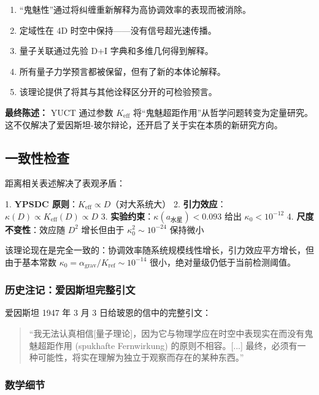 \documentclass[11pt,a4paper]{article}
\begin{document}
	\begin{enumerate}
		\item “鬼魅性”通过将纠缠重新解释为高协调效率的表现而被消除。
		
		\item 定域性在 4D 时空中保持——没有信号超光速传播。
		
		\item 量子关联通过先验 D+I 字典和多维几何得到解释。
		
		\item 所有量子力学预言都被保留，但有了新的本体论解释。
		
		\item 该理论提供了将其与其他诠释区分开的可检验预言。
	\end{enumerate}
	
	\textbf{最终陈述：} YUCT 通过参数 $K_{\mathrm{eff}}$ 将“鬼魅超距作用”从哲学问题转变为定量研究。这不仅解决了爱因斯坦-玻尔辩论，还开启了关于实在本质的新研究方向。
	
	\subsection{一致性检查}
	
	距离相关表述解决了表观矛盾：
	
	1. \textbf{YPSDC 原则}：$K_{\mathrm{eff}} \propto D$（对大系统大）
	2. \textbf{引力效应}：$\kappa(D) \propto K_{\mathrm{eff}}(D) \propto D$
	3. \textbf{实验约束}：$\kappa(a_{\text{水星}}) < 0.093$ 给出 $\kappa_0 < 10^{-12}$
	4. \textbf{尺度不变性}：效应随 $D^2$ 增长但由于 $\kappa_0^2 \sim 10^{-24}$ 保持微小
	
	该理论现在是完全一致的：协调效率随系统规模线性增长，引力效应平方增长，但由于基本常数 $\kappa_0 = \alpha_{\text{grav}}/K_{\text{ref}} \sim 10^{-14}$ 很小，绝对量级仍低于当前检测阈值。
	
	\subsubsection*{历史注记：爱因斯坦完整引文}
	爱因斯坦 1947 年 3 月 3 日给玻恩的信中的完整引文：
	
	\begin{quote}
		“我无法认真相信[量子理论]，因为它与物理学应在时空中表现实在而没有鬼魅超距作用 (spukhafte Fernwirkung) 的原则不相容。[...] 最终，必须有一种可能性，将实在理解为独立于观察而存在的某种东西。”
	\end{quote}
	
	\subsubsection*{数学细节}
	
\end{document}
